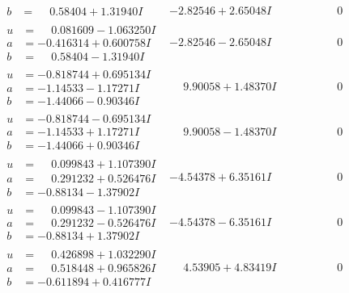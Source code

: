 \documentclass[1p]{elsarticle_modified}
\theoremstyle{definition}
\begin{document}
$$\begin{array}{c|c|c}
\begin{aligned}
b &= \phantom{-}0.58404 + 1.31940 I\end{aligned}
 & -2.82546 + 2.65048 I & \phantom{-0.000000 } 0 \\ \hline\begin{aligned}
u &= \phantom{-}0.081609 - 1.063250 I \\
a &= -0.416314 + 0.600758 I \\
b &= \phantom{-}0.58404 - 1.31940 I\end{aligned}
 & -2.82546 - 2.65048 I & \phantom{-0.000000 } 0 \\ \hline\begin{aligned}
u &= -0.818744 + 0.695134 I \\
a &= -1.14533 - 1.17271 I \\
b &= -1.44066 - 0.90346 I\end{aligned}
 & \phantom{-}9.90058 + 1.48370 I & \phantom{-0.000000 } 0 \\ \hline\begin{aligned}
u &= -0.818744 - 0.695134 I \\
a &= -1.14533 + 1.17271 I \\
b &= -1.44066 + 0.90346 I\end{aligned}
 & \phantom{-}9.90058 - 1.48370 I & \phantom{-0.000000 } 0 \\ \hline\begin{aligned}
u &= \phantom{-}0.099843 + 1.107390 I \\
a &= \phantom{-}0.291232 + 0.526476 I \\
b &= -0.88134 - 1.37902 I\end{aligned}
 & -4.54378 + 6.35161 I & \phantom{-0.000000 } 0 \\ \hline\begin{aligned}
u &= \phantom{-}0.099843 - 1.107390 I \\
a &= \phantom{-}0.291232 - 0.526476 I \\
b &= -0.88134 + 1.37902 I\end{aligned}
 & -4.54378 - 6.35161 I & \phantom{-0.000000 } 0 \\ \hline\begin{aligned}
u &= \phantom{-}0.426898 + 1.032290 I \\
a &= \phantom{-}0.518448 + 0.965826 I \\
b &= -0.611894 + 0.416777 I\end{aligned}
 & \phantom{-}4.53905 + 4.83419 I & \phantom{-0.000000 } 0 \\ \hline\begin{aligned}

\end{aligned}
\end{array}$$
\end{document}
